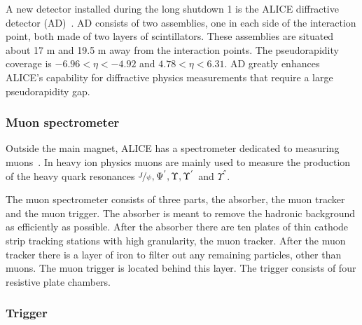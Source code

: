 A new detector installed during the long shutdown 1 is the ALICE diffractive detector (AD)~\cite{AD}. AD consists of two assemblies, one in each side of the interaction point, both made of two layers of scintillators. These assemblies are situated about 17 m and 19.5 m away from the interaction points. The pseudorapidity coverage is $-6.96 < \eta < -4.92 $ and $4.78 < \eta < 6.31$. AD greatly enhances ALICE's capability for diffractive physics measurements that require a large pseudorapidity gap.

\subsubsection{Muon spectrometer}
Outside the main magnet, ALICE has a spectrometer dedicated to measuring muons~\cite{MuonSpectro}. In heavy ion physics muons are mainly used to measure the production of the heavy quark resonances $\nicefrac{J}{\psi}, \Psi^{'}, \Upsilon, \Upsilon^{'}$ and $\Upsilon^{''}$.

The muon spectrometer consists of three parts, the absorber, the muon tracker and the muon trigger. The absorber is meant to remove the hadronic background as efficiently as possible. After the absorber there are ten plates of thin cathode strip tracking stations with high granularity, the muon tracker. After the muon tracker there is a layer of iron to filter out any remaining particles, other than muons. The muon trigger is located behind this layer. The trigger consists of four resistive plate chambers. 
\subsubsection{Trigger}
